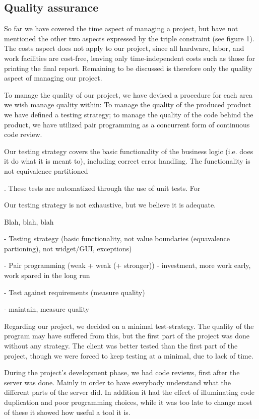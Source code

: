 \subsection{Quality assurance}

So far we have covered the time aspect of managing a project, but have not mentioned the other two aspects expressed by the triple constraint (see figure 1).
The costs aspect does not apply to our project, since all hardware, labor, and work facilities are cost-free, leaving only time-independent costs such as those for printing the final report.
Remaining to be discussed is therefore only the quality aspect of managing our project.

To manage the quality of our project, we have devised a procedure for each area we wish manage quality within: To manage the quality of the produced product we have defined a testing strategy; to manage the quality of the code behind the product, we have utilized pair programming as a concurrent form of continuous code review.

Our testing strategy covers the basic functionality of the business logic (i.e. does it do what it is meant to), including correct error handling. The functionality is not equivalence partitioned


. These tests are automatized through the use of unit tests.
For 

Our testing strategy is not exhaustive, but we believe it is adequate.

Blah, blah, blah



- Testing strategy (basic functionality, not value boundaries (equavalence partioning), not widget/GUI, exceptions)

- Pair programming (weak + weak (+ stronger)) - investment, more work early, work spared in the long run

- Test against requirements (measure quality)


- maintain, measure quality






Regarding our project, we decided on a minimal test-strategy. The quality of the program may have suffered from this, but the first part of the project was done without any strategy. The client was better tested than the first part of the project, though we were forced to keep testing at a minimal, due to lack of time.

During the project's development phase, we had code reviews, first after the server was done. Mainly in order to have everybody understand what the different parts of the server did. In addition it had the effect of illuminating code duplication and poor programming choices, while it was too late to change most of these it showed how useful a tool it is.